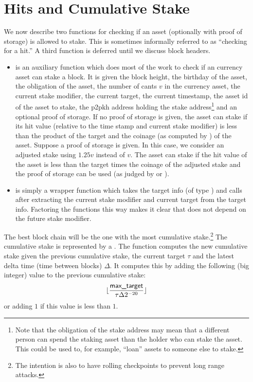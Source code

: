 \section{Hits and Cumulative Stake}

We now describe two functions for checking if an asset
(optionally with proof of storage) is allowed to stake.
This is sometimes informally referred to as ``checking for a hit.''
A third function {} is deferred until
we discuss block headers.

\begin{itemize}
\item {} is an auxiliary function which does most of the work
to check if an currency asset can stake a block.
It is given the block height, the birthday of the asset, the obligation of the asset,
the number of cants $v$ in the currency asset, the current stake modifier, the current target,
the current timestamp, the asset id of the asset to stake, the p2pkh address holding the stake address\footnote{Note that the obligation of the stake address may mean that a different person can spend the staking asset than the holder who can stake the asset. This could be used to, for example, ``loan'' assets to someone else to stake.}
and an optional proof of storage.
If no proof of storage is given,
the asset can stake if its hit value (relative to the time stamp and current stake modifier)
is less than the product of the target and the coinage (as computed by {}) of the asset.
Suppose a proof of storage is given.
In this case, we consider an adjusted stake using $1.25 v$ instead of $v$.
The asset can stake if the hit value of the asset is less than the target times the coinage of the adjusted stake
and the proof of storage can be used (as judged by {} or {}).
\item {} is simply a wrapper function which takes the target info (of type {})
and calls {} after extracting the current stake modifier and current target
from the target info. Factoring the functions this way makes it clear that
{} does not depend on the future stake modifier.
\end{itemize}

The best block chain will be the one with the most cumulative stake.\footnote{The intention is also to have rolling checkpoints to prevent long range attacks.}
The cumulative stake is represented by a {}.
The function {} computes the new cumulative stake
given the previous cumulative stake, the current target $\tau$
and the latest delta time (time between blocks) $\Delta$.
It computes this by adding the following (big integer) value to the previous cumulative stake:
$$\lfloor \frac{\var{max\_target}}{\tau \Delta 2^{-20}} \rfloor$$
or adding $1$ if this value is less than $1$.

